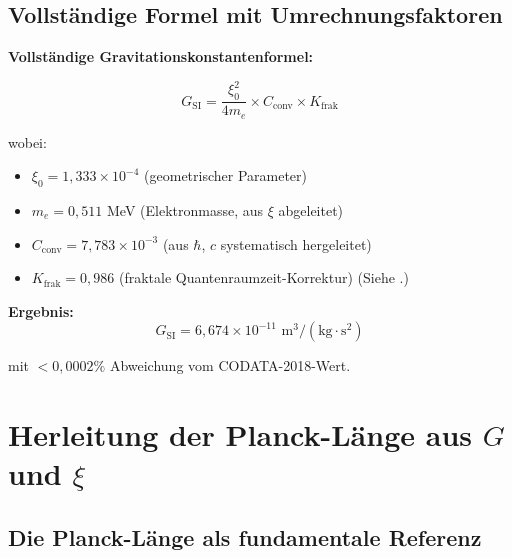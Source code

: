 	\subsection{Vollständige Formel mit Umrechnungsfaktoren}
	
	\begin{keyresult}
		\textbf{Vollständige Gravitationskonstantenformel:}
		
		\begin{equation}
			\boxed{G_{\text{SI}} = \frac{\xi_0^2}{4 m_e} \times C_{\text{conv}} \times K_{\text{frak}}}
			\label{eq:G_complete}
		\end{equation}
		
		wobei:
		\begin{itemize}
			\item $\xi_0 = 1{,}333 \times 10^{-4}$ (geometrischer Parameter)
			\item $m_e = 0{,}511$ MeV (Elektronmasse, aus $\xi$ abgeleitet)
			\item $C_{\text{conv}} = 7{,}783 \times 10^{-3}$ (aus $\hbar$, $c$ systematisch hergeleitet)
			\item $K_{\text{frak}} = 0{,}986$ (fraktale Quantenraumzeit-Korrektur) (Siehe \cite{Fraktale_Korrektur_Herleitung_De}.)
		\end{itemize}
		
		\textbf{Ergebnis:}
		\begin{equation}
			G_{\text{SI}} = 6{,}674 \times 10^{-11} \text{ m}^3/(\text{kg}\cdot\text{s}^2)
		\end{equation}
		
		mit $<0{,}0002\%$ Abweichung vom CODATA-2018-Wert.
	\end{keyresult}
	
	\section{Herleitung der Planck-Länge aus $G$ und $\xi$}
	
	\subsection{Die Planck-Länge als fundamentale Referenz}
	
